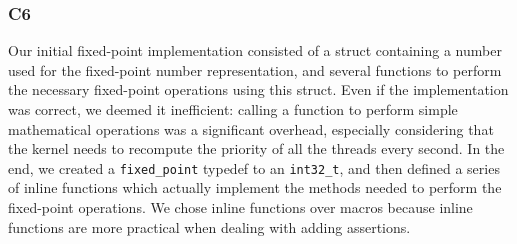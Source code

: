 \documentclass[a4wide, 11pt]{article}
\newcommand{\tx}{\texttt}
\begin{document}
\subsubsection{C6}

Our initial fixed-point implementation consisted of a struct containing a number used for the fixed-point number representation, and several functions to perform the necessary fixed-point operations using this struct. Even if the implementation was correct, we deemed it inefficient: calling a function to perform simple mathematical operations was a significant overhead, especially considering that the kernel needs to recompute the priority of all the threads every second. In the end, we created a \tx{fixed\_point} typedef to an \tx{int32\_t}, and then defined a series of inline functions which actually implement the methods needed to perform the fixed-point operations. We chose inline functions over macros because inline functions are more practical when dealing with adding assertions.
\end{document}

